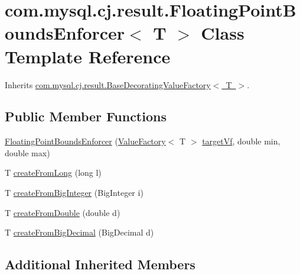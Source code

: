 \hypertarget{classcom_1_1mysql_1_1cj_1_1result_1_1_floating_point_bounds_enforcer}{}\section{com.\+mysql.\+cj.\+result.\+Floating\+Point\+Bounds\+Enforcer$<$ T $>$ Class Template Reference}
\label{classcom_1_1mysql_1_1cj_1_1result_1_1_floating_point_bounds_enforcer}


Inherits \mbox{\hyperlink{classcom_1_1mysql_1_1cj_1_1result_1_1_base_decorating_value_factory}{com.\+mysql.\+cj.\+result.\+Base\+Decorating\+Value\+Factory$<$ T $>$}}.

\subsection*{Public Member Functions}
\begin{DoxyCompactItemize}
\item 
\mbox{\hyperlink{classcom_1_1mysql_1_1cj_1_1result_1_1_floating_point_bounds_enforcer_aa07bf70a9f2746c04c7d5707d57361e3}{Floating\+Point\+Bounds\+Enforcer}} (\mbox{\hyperlink{interfacecom_1_1mysql_1_1cj_1_1result_1_1_value_factory}{Value\+Factory}}$<$ T $>$ \mbox{\hyperlink{classcom_1_1mysql_1_1cj_1_1result_1_1_base_decorating_value_factory_a64c2c62bd9906ec3af7fc62e58bf34b3}{target\+Vf}}, double min, double max)
\item 
T \mbox{\hyperlink{classcom_1_1mysql_1_1cj_1_1result_1_1_floating_point_bounds_enforcer_adafc614949f2e805f53f8d2c2a84923d}{create\+From\+Long}} (long l)
\item 
T \mbox{\hyperlink{classcom_1_1mysql_1_1cj_1_1result_1_1_floating_point_bounds_enforcer_aea2e56ea65f09ae4ec20978ffc6747d6}{create\+From\+Big\+Integer}} (Big\+Integer i)
\item 
T \mbox{\hyperlink{classcom_1_1mysql_1_1cj_1_1result_1_1_floating_point_bounds_enforcer_a23903d828983506aad93a481709e51df}{create\+From\+Double}} (double d)
\item 
T \mbox{\hyperlink{classcom_1_1mysql_1_1cj_1_1result_1_1_floating_point_bounds_enforcer_aece1717acbf4cd73dbdb8b80d80dd3f5}{create\+From\+Big\+Decimal}} (Big\+Decimal d)
\end{DoxyCompactItemize}
\subsection*{Additional Inherited Members}


